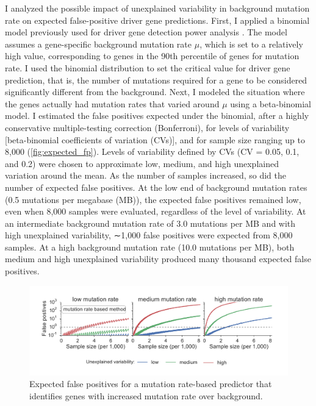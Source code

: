 I analyzed the possible impact of unexplained variability in background mutation rate on expected false-positive driver gene predictions. First, I applied a binomial model previously used for driver gene detection power analysis \cite{RN14}. The model assumes a gene-specific background mutation rate $\mu$, which is set to a relatively high value, corresponding to genes in the 90th percentile of genes for mutation rate. I used the binomial distribution to set the critical value for driver gene prediction, that is, the number of mutations required for a gene to be considered significantly different from the background. Next, I modeled the situation where the genes actually had mutation rates that varied around $\mu$ using a beta-binomial model. I estimated the false positives expected under the binomial, after a highly conservative multiple-testing correction (Bonferroni), for levels of variability [beta-binomial coefficients of variation (CVs)], and for sample size ranging up to 8,000 (\autoref{fig:expected_fp}). Levels of variability defined by CVs (CV = 0.05, 0.1, and 0.2) were chosen to approximate low, medium, and high unexplained variation around the mean. As the number of samples increased, so did the number of expected false positives. At the low end of background mutation rates (0.5 mutations per megabase (MB)), the expected false positives remained low, even when 8,000 samples were evaluated, regardless of the level of variability. At an intermediate background mutation rate of 3.0 mutations per MB and with high unexplained variability, ∼1,000 false positives were expected from 8,000 samples. At a high background mutation rate (10.0 mutations per MB), both medium and high unexplained variability produced many thousand expected false positives.

\begin{figure}
  \centering
  \makeatletter
  \let\@currsize\normalsize
  \includegraphics[width=0.9\linewidth]{figures/chapter2/expected_false_positives_mutation_rate.pdf}
  \caption[Expected false positives for driver gene detection]{Expected false positives for a mutation rate-based predictor that identifies genes with increased mutation rate over background.}
  \label{fig:expected_fp}
\end{figure}

